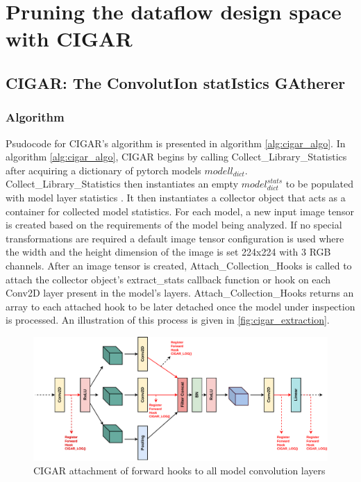 \section{Pruning the dataflow design space with CIGAR}
\label{chap:dda:dataflow_dse:pruning}

\subsection{CIGAR: The ConvolutIon statIstics GAtherer}
\label{chap:dda:dataflow_dse:pruning:cigar}

\subsubsection{Algorithm}
\label{chap:dda:dataflow_dse:pruning:cigar:algo}

Psudocode for \ac{CIGAR}'s algorithm is presented in algorithm
\ref{alg:cigar_algo}. In algorithm \ref{alg:cigar_algo}, \ac{CIGAR} begins by
calling Collect\_Library\_Statistics after acquiring a dictionary of pytorch
models $modell_{dict}$. Collect\_Library\_Statistics then instantiates an empty
$model^{stats}_{dict}$ to be populated with model layer statistics . It then
instantiates a collector object that acts as a container for collected model
statistics. For each model, a new input image tensor is created based on the
requirements of the model being analyzed. If no special transformations are
required a default image tensor configuration is used where the width and the
height dimension of the image is set 224x224 with 3 RGB channels. After an image
tensor is created, Attach\_Collection\_Hooks is called to attach the collector
object's extract\_stats callback function or hook on each Conv2D layer present
in the model's layers. Attach\_Collection\_Hooks returns an array to each
attached hook to be later detached once the model under inspection is processed.
An illustration of this process is given in \autoref{fig:cigar_extraction}.

\begin{figure}
    \centering
    \includegraphics[scale=0.5]{fig/CIGAR.pdf}
    \caption{\ac{CIGAR} attachment of forward hooks to all model convolution layers}
    \label{fig:cigar_extraction}
\end{figure}

